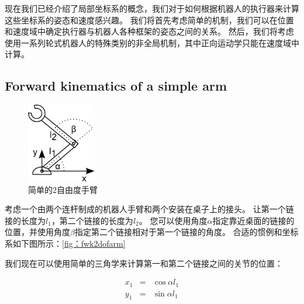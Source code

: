 现在我们已经介绍了局部坐标系的概念，我们对于如何根据机器人的执行器来计算这些坐标系的姿态和速度感兴趣。 我们将首先考虑简单的机制，我们可以在位置和速度域中确定执行器与机器人各种框架的姿态之间的关系。 然后，我们将考虑使用一系列轮式机器人的特殊类别的非全局机制，其中正向运动学只能在速度域中计算。

\subsection{Forward kinematics of a simple arm}
\begin{figure}[!htb]%
  \begin{center}
    \includegraphics[width=0.27\textwidth]{figs/fwk2dofarm}
  \end{center}
  \caption{简单的2自由度手臂}
  \label{fig:fwk2dofarm}
\end{figure}


考虑一个由两个连杆制成的机器人手臂和两个安装在桌子上的接头。 让第一个链接的长度为$ l_1 $，第二个链接的长度为$ l_2 $。 您可以使用角度$ \alpha $指定靠近桌面的链接的位置，并使用角度$ \beta $指定第二个链接相对于第一个链接的角度。 合适的惯例和坐标系如下图所示：\ref {fig：fwk2dofarm}


我们现在可以使用简单的三角学来计算第一和第二个链接之间的关节的位置：

\begin{eqnarray}\label{eq:cosxl1}
x_1 &=&\cos \alpha l_1\\
y_1 &=&\sin \alpha l_1
\end{eqnarray}

